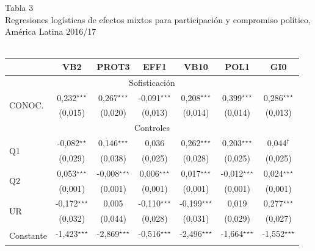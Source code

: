 \documentclass[a4paper]{tufte-handout}
\begin{document}
\begin{table}[h]
  \centering
  \selectfont
   \smallskip\noindent\small Tabla 3 \\ Regresiones logísticas de efectos mixtos para participación y compromiso político, América Latina 2016/17 \\~\\
  \begin{tabular}{l c c c c c c}
    \toprule
     & VB2 & PROT3 & EFF1 & VB10 & POL1 & GI0 \\ \midrule
    \multicolumn{7}{c}{Sofisticación} \\ \midrule
    \multirow{2}{*}{CONOC.} & 0,232$^\star$$^\star$$^\star$ & 0,267$^\star$$^\star$$^\star$ & -0,091$^\star$$^\star$$^\star$ & 0,208$^\star$$^\star$$^\star$ & 0,399$^\star$$^\star$$^\star$ & 0,286$^\star$$^\star$$^\star$ \\
    & {\scriptsize (0,015)} & {\scriptsize (0,020)} & {\scriptsize (0,013)} & {\scriptsize (0,014)} & {\scriptsize (0,014)} & {\scriptsize (0,013)} \\ \midrule
    \multicolumn{7}{c}{Controles} \\ \midrule
    \multirow{2}{*}{Q1} & -0,082$^\star$$^\star$ & 0,146$^\star$$^\star$$^\star$ & 0,036 & 0,262$^\star$$^\star$$^\star$ & 0,203$^\star$$^\star$$^\star$ & 0,044$^\dagger$ \\
    & {\scriptsize (0,029)} & {\scriptsize (0,038)} & {\scriptsize (0,025)} & {\scriptsize (0,028)} & {\scriptsize (0,025)} & {\scriptsize (0,025)} \\ 
    \multirow{2}{*}{Q2} & 0,053$^\star$$^\star$$^\star$ & -0,008$^\star$$^\star$$^\star$ & 0,006$^\star$$^\star$$^\star$ & 0,017$^\star$$^\star$$^\star$ & -0,012$^\star$$^\star$$^\star$ & 0,024$^\star$$^\star$$^\star$ \\
    & {\scriptsize (0,001)} & {\scriptsize (0,001)} & {\scriptsize (0,001)} & {\scriptsize (0,001)} & {\scriptsize (0,001)} & {\scriptsize (0,001)} \\
    \multirow{2}{*}{UR} & -0,172$^\star$$^\star$$^\star$ & 0,005 & -0,110$^\star$$^\star$$^\star$ & -0,199$^\star$$^\star$$^\star$ & 0,019 & 0,277$^\star$$^\star$$^\star$ \\
    & {\scriptsize (0,032)} & {\scriptsize (0,044)} & {\scriptsize (0,028)} & {\scriptsize (0,031)} & {\scriptsize (0,029)} & {\scriptsize (0,027)} \\ \midrule
    \multirow{2}{*}{Constante} & -1,423$^\star$$^\star$$^\star$ & -2,869$^\star$$^\star$$^\star$ & -0,516$^\star$$^\star$$^\star$ & -2,496$^\star$$^\star$$^\star$ & -1,664$^\star$$^\star$$^\star$ & -1,552$^\star$$^\star$$^\star$ \\
$$
\end{tabular}
\end{table}
\end{document}
